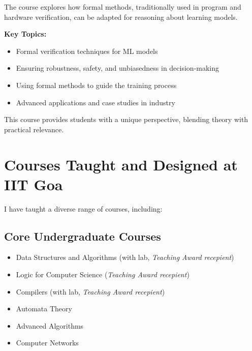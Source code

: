 \documentclass[11pt,a4paper,sans]{moderncv} %
\begin{document}
The course explores how formal methods, traditionally used in program and hardware verification, can be adapted for reasoning about learning models.

\textbf{Key Topics:}
\begin{itemize}
    \item Formal verification techniques for ML models
    \item Ensuring robustness, safety, and unbiasedness in decision-making
    \item Using formal methods to guide the training process
    \item Advanced applications and case studies in industry \\
\end{itemize}

This course provides students with a unique perspective, blending theory with practical relevance.

\section{Courses Taught and Designed at IIT Goa}
I have taught a diverse range of courses, including:

\subsection*{Core Undergraduate Courses}
\begin{varwidth}[t]{.8\textwidth}
\begin{itemize}
    \item Data Structures and Algorithms (with lab, \emph{Teaching Award recepient})
    \item Logic for Computer Science (\emph{Teaching Award recepient})
    \item Compilers (with lab, \emph{Teaching Award recepient})
\end{itemize}

\end{varwidth}%
\hspace{3em}%
\begin{varwidth}[t]{.5\textwidth}
 \begin{itemize}
    \item Automata Theory
    \item Advanced Algorithms
    \item Computer Networks
\end{itemize}
\end{varwidth}
\end{document}
